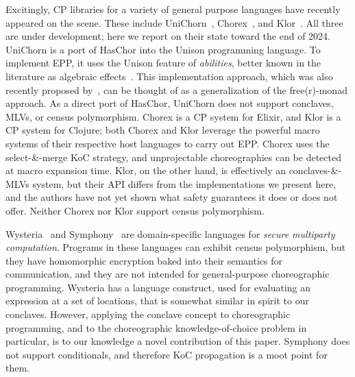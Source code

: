 Excitingly, CP libraries for a variety of general purpose languages have recently appeared on the scene.
These include UniChorn~\cite{unichorn}, Chorex~\cite{chorex-github}, and Klor~\cite{klor-github}.
All three are under development; here we report on their state toward the end of 2024.
UniChorn is a port of HasChor into the Unison programming language.
To implement EPP, it uses the Unison feature of \emph{abilities}, better known in the literature as algebraic effects~\cite{plotkin-2003,plotkin-2013}.
This implementation approach, which was also recently proposed by~\cite{shen-alg-eff-cp},
can be thought of as a generalization of the free(r)-monad approach.
As a direct port of HasChor, UniChorn does not support conclaves, MLVs, or census polymorphism.
Chorex is a CP system for Elixir, and Klor is a CP system for Clojure;
both Chorex and Klor leverage the powerful macro systems of their respective host languages to carry out EPP.
Chorex uses the select-\&-merge KoC strategy, and unprojectable choreographies can be detected at macro expansion time.
Klor, on the other hand, is effectively an conclaves-\&-MLVs system, but their API differs from the implementations we present here,
and the authors have not yet shown what safety guarantees it does or does not offer.
Neither Chorex nor Klor support census polymorphism.

Wysteria~\cite{wysteria} and Symphony~\cite{Sweet_2023} are domain-specific languages for \emph{secure multiparty computation}.
Programs in these languages can exhibit census polymorphism,
but they have homomorphic encryption baked into their
semantics for communication,
and they are not intended for general-purpose choreographic programming.
Wysteria has a  language construct, used for evaluating an expression at a set of locations,
that is somewhat similar in spirit to our conclaves.
However, applying the conclave concept to choreographic programming, and to the choreographic knowledge-of-choice problem in particular,
is to our knowledge a novel contribution of this paper.
Symphony does not support conditionals, and therefore KoC propagation is a moot point for them.






